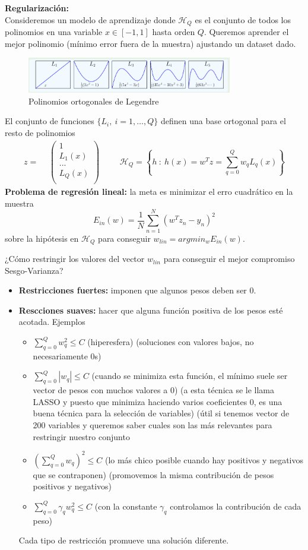 \documentclass[11pt,a4paper]{article}
\theoremstyle{definition}
\begin{document}
	\textbf{Regularización:}\\
	Consideremos un modelo de aprendizaje donde $\mathcal{H}_Q$ es el conjunto de todos los polinomios en una variable $x\in[-1,1]$ hasta orden $Q$. Queremos aprender el mejor polinomio (mínimo error fuera de la muestra) ajustando un dataset dado.
	\begin{figure}[H]
		\centering
		\includegraphics[width=0.8\textwidth]{images/reg_some_th}
		\caption{Polinomios ortogonales de Legendre}
	\end{figure}
	
	El conjunto de funciones $\{L_i,\ i=1,\ldots,Q\}$ definen una base ortogonal para el resto de polinomios
	$$z=\begin{matrix}
	& \left(\begin{matrix}
	1 \\
	L_1(x) \\
	...  \\
	L_Q(x) \\
	\end{matrix}\right)
	\end{matrix}\quad \quad \mathcal{H}_Q=\left\{h \ : \ h(x)=w^Tz=\sum_{q=0}^Q w_qL_q(x)\right\}$$
	\textbf{Problema de regresión lineal:} la meta es minimizar el erro cuadrático en la muestra
	$$E_{in}(w)=\frac{1}{N}\sum_{n=1}^N (w^Tz_n-y_n)^2$$
	 sobre la hipótesis en $\mathcal{H}_Q$ para conseguir $w_{lin}=argmin_w E_{in}(w)$.
	 
	 ¿Cómo  restringir los valores del vector $w_{lin}$ para conseguir el mejor compromiso Sesgo-Varianza?
	 \begin{itemize}
	 	\item \textbf{Restricciones fuertes:} imponen que algunos pesos deben ser 0.
	 	\item \textbf{Rescciones suaves:} hacer que alguna función positiva de los pesos esté acotada. Ejemplos
	 	\begin{itemize}
	 		\item $\sum_{q=0}^Q w_q^2\leq C$ (hiperesfera) (soluciones con valores bajos, no necesariamente 0s)
	 		\item $\sum_{q=0}^Q |w_q|\leq C$ (cuando se minimiza esta función, el mínimo suele ser vector de pesos con muchos valores a 0) (a esta técnica se le llama LASSO y puesto que minimiza haciendo varios coeficientes 0, es una buena técnica para la selección de variables) (útil si tenemos vector de 200 variables y queremos saber cuales son las más relevantes para restringir nuestro conjunto
	 		\item $(\sum_{q=0}^Q w_q)^2 \leq C$ (lo más chico posible cuando hay positivos y negativos que se contraponen) (promovemos la misma contribución de pesos positivos y negativos)
	 		\item $\sum_{q=0}^Q \gamma_q w_q^2 \leq C$ (con la constante $\gamma_q$ controlamos la contribución de cada peso)
	 	\end{itemize}
	 	Cada tipo de restricción promueve una solución diferente.
	 \end{itemize}
\end{document}
